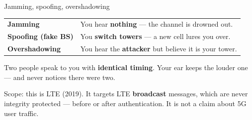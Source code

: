 \begin{frame}{Jamming, spoofing, overshadowing}
  \vspace{0.3em}
  \small
  \renewcommand{\arraystretch}{1.4}
  \begin{tabular}{@{}p{}p{}@{}}
    \toprule
    \textbf{Jamming} & You hear \textbf{nothing} --- the channel is drowned out. \\
    \textbf{Spoofing (fake BS)} & You \textbf{switch towers} --- a new cell lures you over. \\
    \textbf{\textcolor{attackred}{Overshadowing}} & You hear the \textbf{attacker} but believe it is your tower. \\
    \bottomrule
  \end{tabular}

  \vspace{0.8em}
  \normalsize
  Two people speak to you with \textbf{identical timing}. Your ear keeps the
  louder one --- and never notices there were two.

  \vspace{0.6em}
  {\scriptsize\textcolor{softgray}{Scope: this is LTE (2019). It targets LTE
   \textbf{broadcast} messages, which are never integrity protected --- before
   or after authentication. It is not a claim about 5G user traffic.}\par}
\end{frame}

